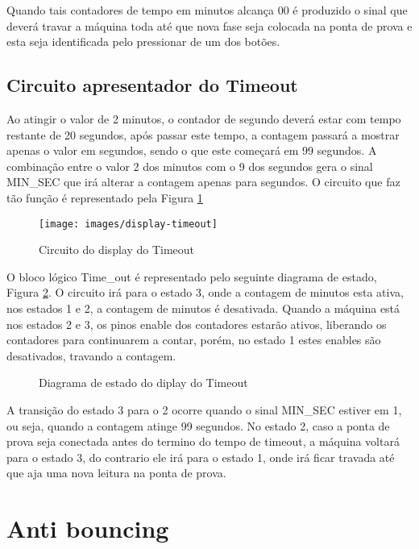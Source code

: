 \documentclass[12pt,a4paper,openany]{abntex2}
\begin{document}
Quando tais contadores de tempo em minutos alcança 00 é produzido o sinal que deverá travar a máquina toda até que nova fase seja colocada na ponta de prova e esta seja identificada pelo pressionar de um dos botões.

\subsection{Circuito apresentador do Timeout}

Ao atingir o valor de 2 minutos, o contador de segundo deverá estar com tempo restante de 20 segundos, após passar este tempo, a contagem passará a mostrar apenas o valor em segundos, sendo o que este começará em 99 segundos. A combinação entre o valor 2 dos minutos com o 9 dos segundos gera o sinal MIN\_SEC que irá alterar a contagem apenas para segundos. O circuito que faz tão função é representado pela Figura \ref{fig:display-timeout}

\begin{figure}[!htp]
	\centering
	\caption{Circuito do display do Timeout}
	\texttt{[image: images/display-timeout]}	\label{fig:display-timeout}
\end{figure}

O bloco lógico Time\_out é representado pelo seguinte diagrama de estado, Figura \ref{fig:diagrama-de-estado-display-timeout}. O circuito irá para o estado 3, onde a contagem de minutos esta ativa, nos estados 1 e 2, a contagem de minutos é desativada. Quando a máquina está nos estados 2 e 3, os pinos enable dos contadores estarão ativos, liberando os contadores para continuarem a contar, porém, no estado 1 estes enables são desativados, travando a contagem.

\begin{figure}[!htp]
	\centering
	\caption{Diagrama de estado do diplay do Timeout}
	\label{fig:diagrama-de-estado-display-timeout}
\end{figure}

A transição do estado 3 para o 2 ocorre quando o sinal MIN\_SEC estiver em 1, ou seja, quando a contagem atinge 99 segundos. No estado 2, caso a ponta de prova seja conectada antes do termino do tempo de timeout, a máquina voltará para o estado 3, do contrario ele irá para o estado 1, onde irá ficar travada até que aja uma nova leitura na ponta de prova.

\section{Anti bouncing}
\end{document}
